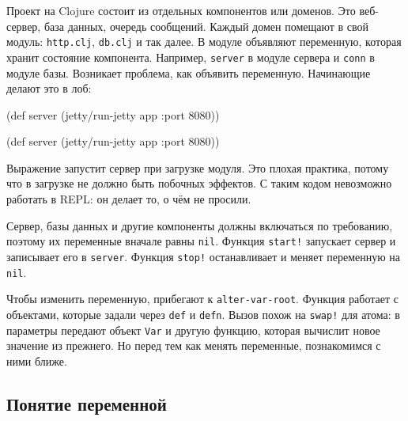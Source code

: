 Проект на Clojure состоит из отдельных компонентов или доменов. Это веб-сервер,
база данных, очередь сообщений. Каждый домен помещают в свой модуль:
\verb|http.clj|, \verb|db.clj| и так далее. В модуле объявляют переменную,
которая хранит состояние компонента. Например, \verb|server| в модуле сервера и
\verb|conn| в модуле базы. Возникает проблема, как объявить
переменную. Начинающие делают это в лоб:

\ifnarrow

\begin{english}
  \begin{clojure}
(def server
  (jetty/run-jetty app {:port 8080}))
  \end{clojure}
\end{english}

\else

\begin{english}
  \begin{clojure}
(def server (jetty/run-jetty app {:port 8080}))
  \end{clojure}
\end{english}

\fi

Выражение запустит сервер при загрузке модуля. Это плохая практика, потому что в
загрузке не должно быть побочных эффектов. С таким кодом невозможно работать в
REPL: он делает то, о чём не просили.

Сервер, базы данных и другие компоненты должны включаться по требованию, поэтому
их переменные вначале равны \verb|nil|. Функция \verb|start!| запускает
сервер и записывает его в \verb|server|. Функция \verb|stop!| останавливает
и меняет переменную на \verb|nil|.


Чтобы изменить переменную, прибегают к \verb|alter-var-root|. Функция работает с
объектами, которые задали через \verb|def| и \verb|defn|. Вызов похож на
\verb|swap!| для атома: в параметры передают объект \verb|Var| и другую функцию,
которая вычислит новое значение из прежнего. Но перед тем как менять переменные,
познакомимся с ними ближе.

\ifafive\vspace{15mm}\fi

\subsection{Понятие переменной}

\label{var-section}

